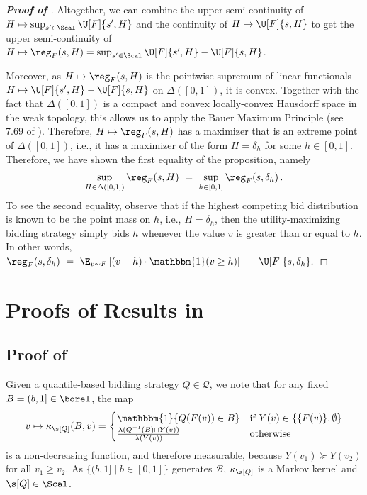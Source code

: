 \begin{proof}[\textbf{Proof of }]
	Altogether, we can combine the upper semi-continuity of $H \mapsto \sup_{s' \in \Scal} \U[F]{s',H}$ and the continuity of $H \mapsto \U[F]{s,H}$ to get the upper semi-continuity of $H \mapsto \reg_F(s,H) = \sup_{s' \in \Scal} \U[F]{s',H} - \U[F]{s,H}$. 
    
    Moreover, as $H \mapsto \reg_F(s,H)$ is the pointwise supremum of linear functionals $H \mapsto \U[F]{s',H} - \U[F]{s,H}$ on $\Delta([0,1])$, it is convex. Together with the fact that $\Delta([0,1])$ is a compact and convex locally-convex Hausdorff space in the weak topology, this allows us to apply the Bauer Maximum Principle (see 7.69 of \citealt{aliprantis2006infinite}). Therefore,  $H \mapsto \reg_F(s,H)$ has a maximizer that is an extreme point of $\Delta([0,1])$, i.e., it has a maximizer of the form $H = \delta_h$ for some $h \in [0,1]$. Therefore, we have shown the first equality of the proposition, namely
	\begin{align*}
		\sup_{H \in \Delta([0,1])} \reg_F(s,H)\ =\ \sup_{h\in [0,1]} \reg_F(s,\delta_h)\,.
	\end{align*}
	To see the second equality, observe that if the highest competing bid distribution is known to be the point mass on $h$, i.e., $H = \delta_h$, then the utility-maximizing bidding strategy simply bids $h$ whenever the value $v$ is greater than or equal to $h$. In other words, $\reg_F(s,\delta_h)\ =\ \E_{v \sim F}\left[ (v-h) \cdot \mathbbm{1}(v \geq h) \right]\ -\ \U[F]{s,\delta_h}.$
\end{proof}


\section{Proofs of Results in }

\subsection{Proof of }\label{appendix:minimax-remark}
Given a quantile-based bidding strategy $Q \in \mathcal{Q}$, we note that for any fixed $B = (b,1] \in \borel$, the map 
	\begin{align*}
		v \mapsto \kappa_{\s[Q]}(B, v) = \begin{cases}
			\mathbbm{1} \{ Q(F(v)) \in B \} &\text{if }Y(v) \in \{\{F(v)\}, \emptyset\}\\
			\frac{\lambda(Q^{-1}(B) \cap Y(v))}{\lambda(Y(v))} &\text{otherwise}
		\end{cases}
	\end{align*} 
is a non-decreasing function, and therefore measurable, because $Y(v_1)\succcurlyeq Y(v_2)$ for all $v_1 \geq v_2$. As ${\{(b,1]\mid b\in [0,1]\}}$ generates $\mathcal B$, $\kappa_{\s[Q]}$ is a Markov kernel and $\s[Q] \in \Scal$.


